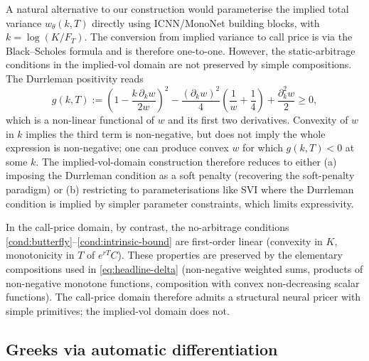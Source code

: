 \documentclass[largeformat]{interact}
\let\cite\citep   %
\theoremstyle{plain}
\theoremstyle{definition}
\newcommand{\eqdef}{:=}
\newcommand{\bs}{Black--Scholes}
\begin{document}
A natural alternative to our construction would parameterise the implied total variance $w_\theta(k, T)$ directly using ICNN/MonoNet building blocks, with $k = \log(K/F_T)$. The conversion from implied variance to call price is via the \bs{} formula and is therefore one-to-one. However, the static-arbitrage conditions in the implied-vol domain are not preserved by simple compositions. The Durrleman positivity \cite{gatheral2014arbitrage,jacquier2014arbitrage} reads
\begin{equation}
\label{eq:durrleman}
g(k, T) \eqdef \left( 1 - \frac{k\,\partial_k w}{2w}\right)^2 - \frac{(\partial_k w)^2}{4}\!\left( \frac{1}{w} + \frac{1}{4}\right) + \frac{\partial^2_k w}{2} \geq 0,
\end{equation}
which is a non-linear functional of $w$ and its first two derivatives. Convexity of $w$ in $k$ implies the third term is non-negative, but does not imply the whole expression is non-negative; one can produce convex $w$ for which $g(k, T) < 0$ at some $k$. The implied-vol-domain construction therefore reduces to either (a) imposing the Durrleman condition as a soft penalty (recovering the soft-penalty paradigm) or (b) restricting to parameterisations like SVI where the Durrleman condition is implied by simpler parameter constraints, which limits expressivity.

In the call-price domain, by contrast, the no-arbitrage conditions \ref{cond:butterfly}--\ref{cond:intrinsic-bound} are first-order linear (convexity in $K$, monotonicity in $T$ of $e^{rT}C$). These properties are preserved by the elementary compositions used in \cref{eq:headline-delta} (non-negative weighted sums, products of non-negative monotone functions, composition with convex non-decreasing scalar functions). The call-price domain therefore admits a structural neural pricer with simple primitives; the implied-vol domain does not.

\subsection{Greeks via automatic differentiation}
\label{sec:greeks-overview}
\end{document}
